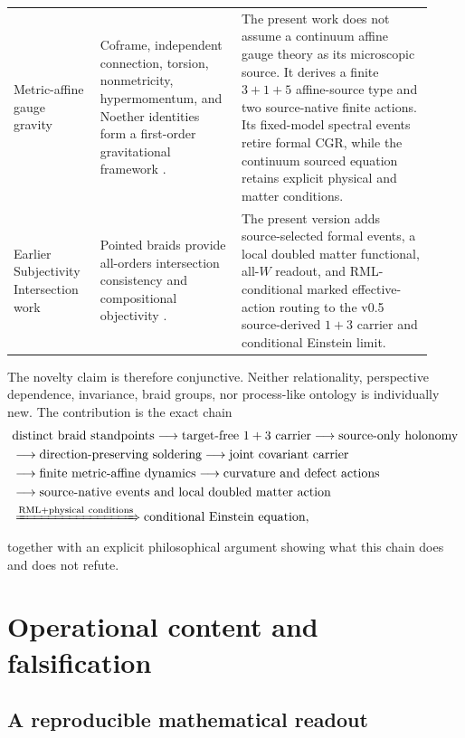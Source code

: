 \documentclass[11pt]{article}
\theoremstyle{definition}
\theoremstyle{remark}
\begin{document}
{\begin{longtable}{>{\raggedright\arraybackslash}p{0.19\linewidth}>{\raggedright\arraybackslash}p{0.31\linewidth}>{\raggedright\arraybackslash}p{0.42\linewidth}}
Metric-affine gauge gravity & Coframe, independent connection, torsion, nonmetricity, hypermomentum, and Noether identities form a first-order gravitational framework \cite{hehl1995}. & The present work does not assume a continuum affine gauge theory as its microscopic source. It derives a finite $3+1+5$ affine-source type and two source-native finite actions. Its fixed-model spectral events retire formal CGR, while the continuum sourced equation retains explicit physical and matter conditions. \\
Earlier Subjectivity Intersection work & Pointed braids provide all-orders intersection consistency and compositional objectivity \cite{watanabe2026braid}. & The present version adds source-selected formal events, a local doubled matter functional, all-$W$ readout, and RML-conditional marked effective-action routing to the v0.5 source-derived $1+3$ carrier and conditional Einstein limit. \\
\bottomrule
\end{longtable}
}

The novelty claim is therefore conjunctive. Neither relationality, perspective dependence, invariance, braid groups, nor process-like ontology is individually new. The contribution is the exact chain
\begin{equation}\label{eq:novelchain}
\begin{aligned}
&\text{distinct braid standpoints}
\longrightarrow\text{target-free $1+3$ carrier}
\longrightarrow\text{source-only holonomy}\\
&\longrightarrow\text{direction-preserving soldering}
\longrightarrow\text{joint covariant carrier}\\
&\longrightarrow\text{finite metric-affine dynamics}
\longrightarrow\text{curvature and defect actions}\\
&\longrightarrow\text{source-native events and local doubled matter action}\\
&\xRightarrow{\mathrm{RML+physical\ conditions}}
 \text{conditional Einstein equation},
\end{aligned}
\end{equation}
together with an explicit philosophical argument showing what this chain does and does not refute.

\section{Operational content and falsification}

\subsection{A reproducible mathematical readout}
\end{document}
